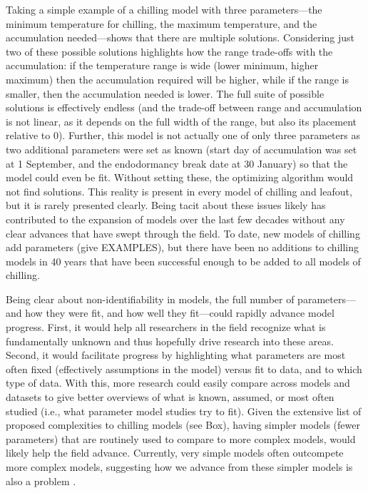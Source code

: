 \documentclass[11pt]{article}
\begin{document}
Taking a simple example of a chilling model with three parameters---the minimum temperature for chilling, the maximum temperature, and the accumulation needed---shows that there are multiple solutions. Considering just two of these possible solutions highlights how the range trade-offs with the accumulation: if the temperature range is wide (lower minimum, higher maximum) then the accumulation required will be higher, while if the range is smaller, then the accumulation needed is lower. The full suite of possible solutions is effectively endless (and the trade-off between range and accumulation is not linear, as it depends on the full width of the range, but also its placement relative to 0). Further, this model is not actually one of only three parameters as two additional parameters were set as known (start day of accumulation was set at 1 September, and the endodormancy break date at 30 January) so that the model could even be fit. Without setting these, the optimizing algorithm would not find solutions. This reality is present in every model of chilling and leafout, but it is rarely presented clearly. %
Being tacit about these issues likely has contributed to the expansion of models over the last few decades without any clear advances that have swept through the field. To date, new models of chilling add parameters (give EXAMPLES), but there have been no additions to chilling models in 40 years that have been successful enough to be added to all models of chilling. 

Being clear about non-identifiability in models, the full number of parameters---and how they were fit, and how well they fit---could rapidly advance model progress. First, it would help all researchers in the field recognize what is fundamentally unknown and thus hopefully drive research into these areas. Second, it would facilitate progress by highlighting what parameters are most often fixed (effectively assumptions in the model) versus fit to data, and to which type of data. With this, more research could easily compare across models and datasets to give better overviews of what is known, assumed, or most often studied (i.e., what parameter model studies try to fit). Given the extensive list of proposed complexities to chilling models (see Box), having simpler models (fewer parameters) that are routinely used to compare to more complex models, would likely help the field advance. Currently, very simple models often outcompete more complex models, suggesting how we advance from these simpler models is also a problem \citep[e.g.,][]{basler2016evaluating}. 
\end{document}
